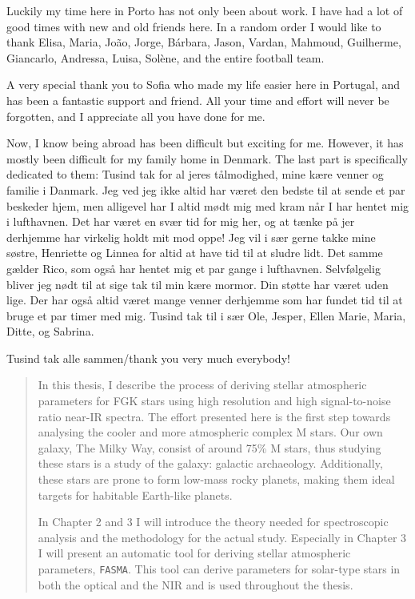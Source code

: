 \documentclass[fleqn]{fcup-thesis}
\newcommand{\code}[1]{\texttt{#1}}
\begin{document}
\begin{preliminary}
\begin{acknowledgements}
Luckily my time here in Porto has not only been about work. I have had a lot of good times with new
and old friends here. In a random order I would like to thank Elisa, Maria, Jo\~{a}o, Jorge,
B\'{a}rbara, Jason, Vardan, Mahmoud, Guilherme, Giancarlo, Andressa, Luisa, Solène, and the entire
football team.

A very special thank you to Sofia who made my life easier here in Portugal, and has been a fantastic
support and friend. All your time and effort will never be forgotten, and I appreciate all you have
done for me.

Now, I know being abroad has been difficult but exciting for me. However, it has mostly been
difficult for my family home in Denmark. The last part is specifically dedicated to them: Tusind tak
for al jeres tålmodighed, mine kære venner og familie i Danmark. Jeg ved jeg ikke altid har været
den bedste til at sende et par beskeder hjem, men alligevel har I altid mødt mig med kram når I har
hentet mig i lufthavnen. Det har været en svær tid for mig her, og at tænke på jer derhjemme har
virkelig holdt mit mod oppe! Jeg vil i sær gerne takke mine søstre, Henriette og Linnea for altid at
have tid til at sludre lidt. Det samme gælder Rico, som også har hentet mig et par gange i
lufthavnen. Selvfølgelig bliver jeg nødt til at sige tak til min kære mormor. Din støtte har været
uden lige. Der har også altid været mange venner derhjemme som har fundet tid til at bruge et par
timer med mig. Tusind tak til i sær Ole, Jesper, Ellen Marie, Maria, Ditte, og Sabrina.

\vspace{7mm}
Tusind tak alle sammen/thank you very much everybody!


\end{acknowledgements}



\begin{abstract}

In this thesis, I describe the process of deriving stellar atmospheric parameters for FGK stars
using high resolution and high signal-to-noise ratio near-IR spectra. The effort presented here is
the first step towards analysing the cooler and more atmospheric complex M stars. Our own galaxy,
The Milky Way, consist of around 75\% M stars, thus studying these stars is a study of the galaxy:
galactic archaeology. Additionally, these stars are prone to form low-mass rocky planets, making
them ideal targets for habitable Earth-like planets.

In Chapter 2 and 3 I will introduce the theory needed for spectroscopic analysis and the methodology
for the actual study. Especially in Chapter 3 I will present an automatic tool for deriving stellar
atmospheric parameters, \code{FASMA}. This tool can derive parameters for solar-type stars in both
the optical and the NIR and is used throughout the thesis.


\end{abstract}
\end{preliminary}
\end{document}
